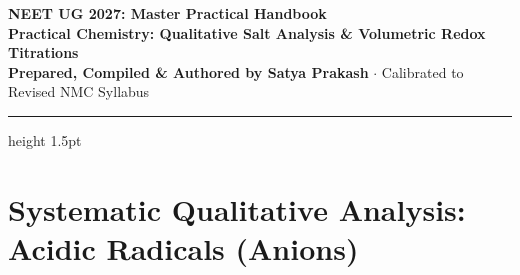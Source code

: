 \documentclass[10pt,a4paper]{article}
\begin{document}
\begin{center}
  {\Huge \textbf{NEET UG 2027: Master Practical Handbook}}\\[6pt]
  {\Large \textbf{Practical Chemistry: Qualitative Salt Analysis \& Volumetric Redox Titrations}}\\[4pt]
  {\small \textbf{Prepared, Compiled \& Authored by Satya Prakash} $\cdot$ Calibrated to Revised NMC Syllabus}
  \vspace{4pt}
  \hrule height 1.5pt
\end{center}

\pagestyle{fancy}
\fancyhf{}
\fancyfoot[C]{\thepage}

\section{Systematic Qualitative Analysis: Acidic Radicals (Anions)}
\end{document}
